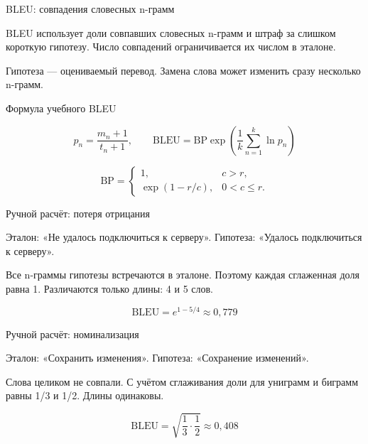 \documentclass[aspectratio=169,12pt]{beamer}
\begin{document}
\begin{frame}{BLEU: совпадения словесных n-грамм}
\color{ink}
{\small BLEU использует доли совпавших словесных n-грамм и штраф за слишком короткую гипотезу. Число совпадений ограничивается их числом в эталоне.
\par\vspace{0.6em}Гипотеза — оцениваемый перевод. Замена слова может изменить сразу несколько n-грамм.}
\end{frame}

\begin{frame}{Формула учебного BLEU}
\color{ink}
{\small \[\displaystyle p_n=\frac{m_n+1}{t_n+1},\qquad \mathrm{BLEU}=\mathrm{BP}\exp\left(\frac1k\sum_{n=1}^{k}\ln p_n\right)\]
\par\vspace{0.6em}\[\displaystyle \mathrm{BP}=\begin{cases}1,&c>r,\\ \exp(1-r/c),&0<c\le r.\end{cases}\]}
\end{frame}

\begin{frame}{Ручной расчёт: потеря отрицания}
\color{ink}
{\small Эталон: «Не удалось подключиться к серверу». Гипотеза: «Удалось подключиться к серверу».
\par\vspace{0.6em}Все n-граммы гипотезы встречаются в эталоне. Поэтому каждая сглаженная доля равна 1. Различаются только длины: 4 и 5 слов.
\par\vspace{0.6em}\[\displaystyle \mathrm{BLEU}=e^{1-5/4}\approx0{,}779\]}
\end{frame}

\begin{frame}{Ручной расчёт: номинализация}
\color{ink}
{\small Эталон: «Сохранить изменения». Гипотеза: «Сохранение изменений».
\par\vspace{0.6em}Слова целиком не совпали. С учётом сглаживания доли для униграмм и биграмм равны 1/3 и 1/2. Длины одинаковы.
\par\vspace{0.6em}\[\displaystyle \mathrm{BLEU}=\sqrt{\frac13\cdot\frac12}\approx0{,}408\]}
\end{frame}
\end{document}
